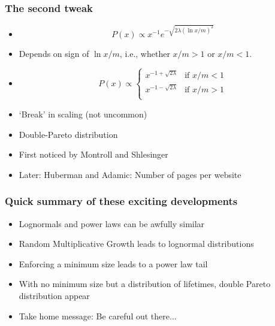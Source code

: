 \begin{frame}
  \frametitle{The second tweak}

  \begin{itemize}
  \item<1-> $$
    P(x)
    \propto
    x^{-1} e^{- \sqrt{2\lambda (\ln x/m) ^2}} 
    $$
  \item<2-> Depends on sign of $\ln x/m$, i.e., whether $x/m>1$ or $x/m<1$.
  \item<3-> 
    $$
    P(x) 
    \propto
    \left\{
      \begin{array}{cl}
        x^{-1 + \sqrt{2\lambda}} & \mbox{if $x/m<1$} \\
        x^{-1 - \sqrt{2\lambda}} & \mbox{if $x/m>1$} \\
      \end{array}
    \right.
    $$
  \item<4-> \alert{`Break' in scaling} (not uncommon)
  \item<5-> Double-Pareto distribution
  \item<6->
    First noticed by Montroll and Shlesinger\cite{montroll1982a,montroll1983a}
  \item<7-> 
    Later: Huberman and Adamic\cite{huberman1999a,huberman2000a}: Number of pages per website
  \end{itemize}

\end{frame}

\begin{frame}
  \frametitle{Quick summary of these exciting developments}
  
  \begin{itemize}
  \item<1-> Lognormals and power laws can be awfully similar
  \item<2-> Random Multiplicative Growth leads to lognormal distributions
  \item<3-> Enforcing a minimum size leads to a power law tail
  \item<4-> With no minimum size but a distribution of lifetimes, 
    double Pareto distribution appear
  \item<5-> Take home message: Be careful out there...
  \end{itemize}

  
\end{frame}

